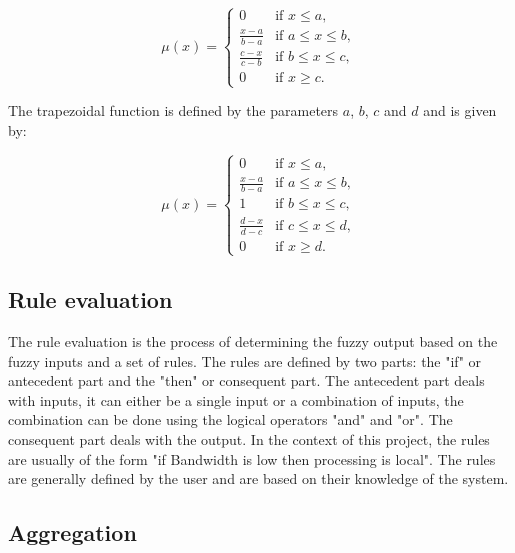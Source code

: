 \begin{equation}
  \mu(x) = \begin{cases}
    0                   & \text{if } x \leq a,        \\
    \frac{x - a}{b - a} & \text{if } a \leq x \leq b, \\
    \frac{c - x}{c - b} & \text{if } b \leq x \leq c, \\
    0                   & \text{if } x \geq c.
  \end{cases}
\end{equation}

The trapezoidal function is defined by the parameters $a$, $b$, $c$ and $d$ and is given by:

\begin{equation}
  \mu(x) = \begin{cases}
    0                   & \text{if } x \leq a,        \\
    \frac{x - a}{b - a} & \text{if } a \leq x \leq b, \\
    1                   & \text{if } b \leq x \leq c, \\
    \frac{d - x}{d - c} & \text{if } c \leq x \leq d, \\
    0                   & \text{if } x \geq d.
  \end{cases}
\end{equation}

\subsection{Rule evaluation}
\label{subsec:fuzzy-rule-evaluation}

The rule evaluation is the process of determining the fuzzy output based on the fuzzy inputs and a set of rules. The
rules are defined by two parts: the "if" or antecedent part and the "then" or consequent part. The antecedent part
deals with inputs, it can either be a single input or a combination of inputs, the combination can be done using the
logical operators "and" and "or". The consequent part deals with the output. In the context of this project, the rules
are usually of the form "if Bandwidth is low then processing is local". The rules are generally defined by the user
and are based on their knowledge of the system.

\subsection{Aggregation}
\label{subsec:fuzzy-aggregation}

